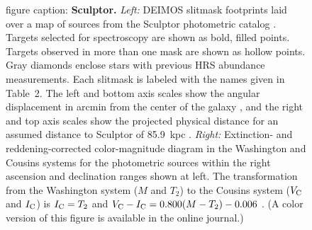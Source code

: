\documentclass{emulateapj}
\begin{document}
\begin{figure}[hp!]
{{    figure caption: {\bf Sculptor.}  {\it Left:} DEIMOS slitmask
    footprints laid over a map of sources from the Sculptor
    photometric catalog \citep{wes06}.  Targets selected for
    spectroscopy are shown as bold, filled points.  Targets observed
    in more than one mask are shown as hollow points.  Gray diamonds
    enclose stars with previous HRS abundance measurements.  Each
    slitmask is labeled with the names given in Table~2.  The left and
    bottom axis scales show the angular displacement in arcmin from
    the center of the galaxy \citep[$\alpha_0 =
      1^{\rm{h}}00^{\rm{m}}09^{\rm{s}}$, $\delta_0 = -33^{\circ}42
      \farcm 5$,][]{mat98}, and the right and top axis scales show the
    projected physical distance for an assumed distance to Sculptor of
    85.9~kpc \citep{pie08}.  {\it Right:} Extinction- and
    reddening-corrected color-magnitude diagram in the Washington and
    Cousins systems for the photometric sources within the right
    ascension and declination ranges shown at left.  The
    transformation from the Washington system ($M$ and $T_2$) to the
    Cousins system ($V_{\rm C}$ and $I_{\rm C}$) is $I_{\rm C} = T_2$
    and $V_{\rm C} - I_{\rm C} = 0.800(M-T_2) - 0.006$ \citep{maj00}.
    (A color version of this figure is available in the online
    journal.)}\label{fig:scl}}
\end{figure}
\end{document}

